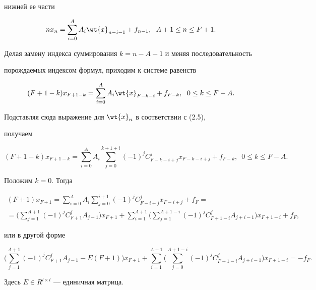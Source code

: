 нижней ее части


$$


nx_{n}=\sum_{i=0}^{A}A_{i}\wt{x}_{n-i-1}+f_{n-1},\ \;


A+1\leq n\leq F+1.


$$


Делая замену индекса суммирования $k=n-A-1$ и меняя последовательность


порождаемых индексом формул, приходим к системе равенств


$$


(F+1-k)x_{F+1-k}=\sum_{i=0}^{A}A_{i}\wt{x}_{F-k-i}+f_{F-k},\ \;


0\leq k\leq F-A.


$$


Подставляя сюда выражение для $\wt{x}_{n}$ в соответствии с (2.5),


получаем


$$


(F+1-k)x_{F+1-k}=\sum_{i=0}^{A}A_{i}


\sum_{j=0}^{k+1+i}(-1)^{j}C_{F-k-i+j}^{j}x_{F-k-i+j}+f_{F-k},\ \;


0\leq k\leq F-A.


$$


Положим $k=0$. Тогда


\begin{multline*}


(F+1)x_{F+1}=\sum_{i=0}^{A}A_{i}


\sum_{j=0}^{i+1}(-1)^{j}C_{F-i+j}^{j}x_{F-i+j}+f_{F}= \\


%


=\bigg(\sum_{j=1}^{A+1}(-1)^{j}C_{F+1}^{j}A_{j-1}\bigg)x_{F+1}


+\sum_{i=1}^{A+1}\bigg(\sum_{j=1}^{A+1-i}(-1)^{j}C_{F+1-i}^{j}


A_{j+i-1}\bigg)x_{F+1-i}+f_{F},


\end{multline*}


или в другой форме


$$


\bigg(\sum_{j=1}^{A+1}(-1)^{j}C_{F+1}^{j}A_{j-1}-E(F+1)\bigg)x_{F+1}


+\sum_{i=1}^{A+1}\bigg(\sum_{j=0}^{A+1-i}(-1)^{j}C_{F+1-i}^{j}


A_{j+i-1}\bigg)x_{F+1-i}=-f_{F}.


$$


Здесь $E\in R^{l\times l}$ --- единичная матрица.


